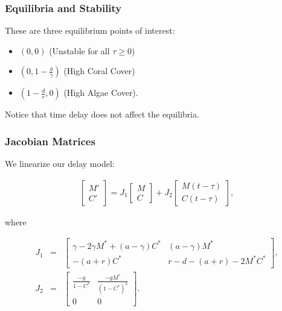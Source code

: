\begin{frame}
\frametitle{Equilibria and Stability}
These are three equilibrium points of interest: 
\begin{itemize}
\item $(0,0)$ (Unstable for all $\tau\geq0$)\\
\item $(0,1-\frac{g}{\gamma})$ (High Coral Cover)\\
\item $(1-\frac{d}{r},0)$ (High Algae Cover).
\end{itemize} 
Notice that time delay does not affect the equilibria.
\end{frame}


\begin{frame}\frametitle{Jacobian Matrices}
We linearize our delay model:

\begin{eqnarray}
  \label{eqn:linearizedDelayModel}
  \begin{bmatrix} 
    M'\\C'
  \end{bmatrix}=J_1
  \begin{bmatrix} 
    M \\
    C
  \end{bmatrix} + 
  J_2
  \begin{bmatrix}
    M(t-\tau) \\
    C(t-\tau)
  \end{bmatrix},
\end{eqnarray}

where 

\begin{eqnarray*}
  J_1 & = & \begin{bmatrix}
    \gamma-2\gamma M^* +(a-\gamma)C^* & (a-\gamma)M^*\\
    -(a+r)C^* & r-d-(a+r)-2M^*C^* 
  \end{bmatrix},  \\
  J_2 & = & 
  \begin{bmatrix} 
    \frac{-g}{1-C^*} & \frac{-gM^*}{(1-C^*)^2} \\ 
    0 & 0
  \end{bmatrix}.
\end{eqnarray*}

\end{frame}

